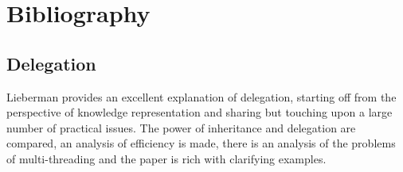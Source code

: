 \documentclass[a4paper,12pt]{book}
\begin{document}









\chapter{Bibliography}
\section*{Delegation}
Lieberman provides an excellent explanation of delegation, starting off from the perspective of knowledge representation and sharing but touching upon a large number of practical issues. The power of inheritance and delegation are compared, an analysis of efficiency is made, there is an analysis of the problems of multi-threading and the paper is rich with clarifying examples.
\end{document}
